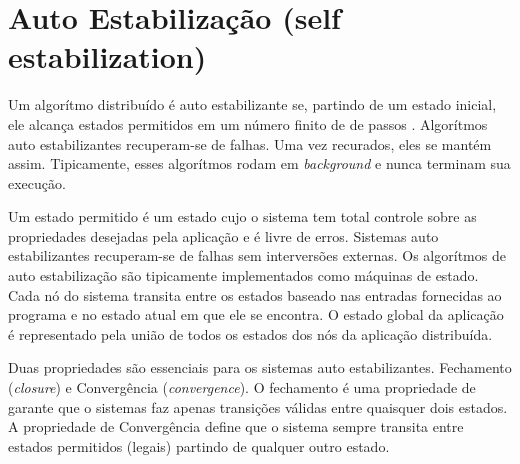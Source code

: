 \section{Auto Estabilização (self estabilization)}

Um algorítmo distribuído é auto estabilizante se, partindo de um estado 
inicial, ele alcança estados permitidos em um número finito de de passos
\citep{erciyes2013distributed}.
Algorítmos auto estabilizantes recuperam-se de falhas. 
Uma vez recurados, eles se mantém assim. 
Tipicamente, esses algorítmos rodam em \emph{background} e nunca terminam 
sua execução.

Um estado permitido é um estado cujo o sistema tem total controle sobre 
as propriedades desejadas pela aplicação e é livre de erros.
Sistemas auto estabilizantes recuperam-se de falhas sem interversões externas.
Os algorítmos de auto estabilização são tipicamente implementados como 
máquinas de estado. 
Cada nó do sistema transita entre os estados baseado 
nas entradas fornecidas ao programa e no estado atual em que ele se encontra.
O estado global da aplicação é representado pela união de todos os estados
dos nós da aplicação distribuída.

Duas propriedades são essenciais para os sistemas auto estabilizantes. 
Fechamento (\emph{closure}) e Convergência (\emph{convergence}).
O fechamento é uma propriedade de garante que o sistemas faz apenas transições
válidas entre quaisquer dois estados.
A propriedade de Convergência define que o sistema sempre transita entre 
estados permitidos (legais) partindo de qualquer outro estado.
